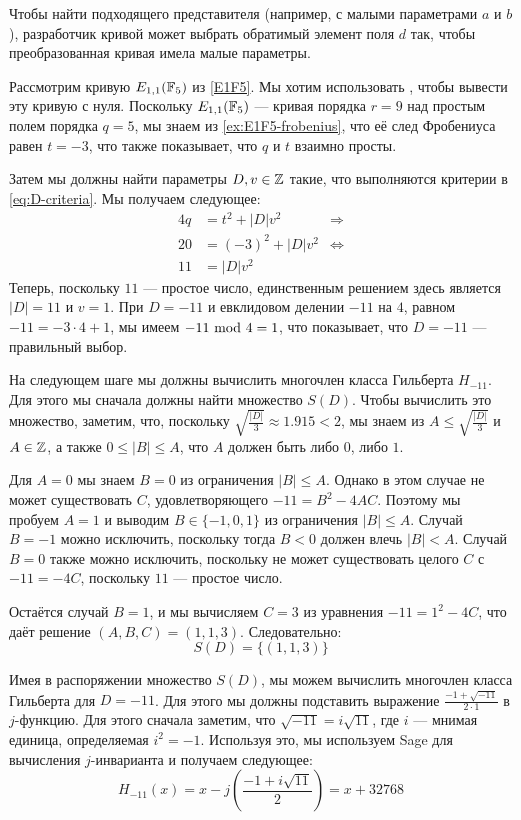 Чтобы найти подходящего представителя (например, с малыми параметрами $a$ и $b$), разработчик кривой может выбрать обратимый элемент поля $d$ так, чтобы преобразованная кривая имела малые параметры.

\begin{example} Рассмотрим кривую $E_{1,1}(\mathbb{F}_5)$ из \examplename{} \ref{E1F5}. Мы хотим использовать , чтобы вывести эту кривую с нуля. Поскольку $E_{1,1}(\mathbb{F}_5)$ — кривая порядка $r=9$ над простым полем порядка $q=5$, мы знаем из \examplename{} \ref{ex:E1F5-frobenius}, что её след Фробениуса равен $t=-3$, что также показывает, что $q$ и $t$ взаимно просты. 

Затем мы должны найти параметры $D,v\in\mathbb{Z}$ такие, что выполняются критерии в \ref{eq:D-criteria}. Мы получаем следующее:
\begin{align*}
4q & = t^2+ |D|v^2 & \Rightarrow \\
20 & = (-3)^2 + |D|v^2 & \Leftrightarrow \\
11 & = |D|v^2
\end{align*}
Теперь, поскольку $11$ — простое число, единственным решением здесь является $|D|=11$ и $v=1$. При $D=-11$ и евклидовом делении $-11$ на $4$, равном $-11 = -3\cdot 4 +1$, мы имеем $-11 \text{ mod } 4=1$, что показывает, что $D=-11$ — правильный выбор.

На следующем шаге мы должны вычислить многочлен класса Гильберта $H_{-11}$. Для этого мы сначала должны найти множество $S(D)$. Чтобы вычислить это множество, заметим, что, поскольку $\sqrt{\frac{|D|}{3}}\approx 1.915<2$, мы знаем из $A\leq \sqrt{\frac{|D|}{3}}$ и $A\in\mathbb{Z}$, а также $0\leq |B|\leq A$, что $A$ должен быть либо $0$, либо $1$. 

Для $A=0$ мы знаем $B=0$ из ограничения $|B|\leq A$. Однако в этом случае не может существовать $C$, удовлетворяющего $-11= B^2 -4AC$. Поэтому мы пробуем $A=1$ и выводим $B\in\{-1,0,1\}$ из ограничения $|B|\leq A$. Случай $B=-1$ можно исключить, поскольку тогда $B<0$ должен влечь $|B|<A$. Случай $B=0$ также можно исключить, поскольку не может существовать целого $C$ с $-11 = -4C$, поскольку $11$ — простое число. 

Остаётся случай $B=1$, и мы вычисляем $C=3$ из уравнения $-11 = 1^2 -4C$, что даёт решение $(A,B,C)=(1,1,3)$. Следовательно:
$$
S(D)=\{(1,1,3)\}
$$

Имея в распоряжении множество $S(D)$, мы можем вычислить многочлен класса Гильберта для $D=-11$. Для этого мы должны подставить выражение $\frac{-1+\sqrt{-11}}{2\cdot1}$ в $j$-функцию. Для этого сначала заметим, что $\sqrt{-11}=i\sqrt{11}$, где $i$ — мнимая единица, определяемая $i^2=-1$. Используя это, мы используем Sage для вычисления $j$-инварианта и получаем следующее:
$$
H_{-11}(x) = x - j\left(\frac{-1+i\sqrt{11}}{2}\right) = x + 32768
$$


\end{example}
